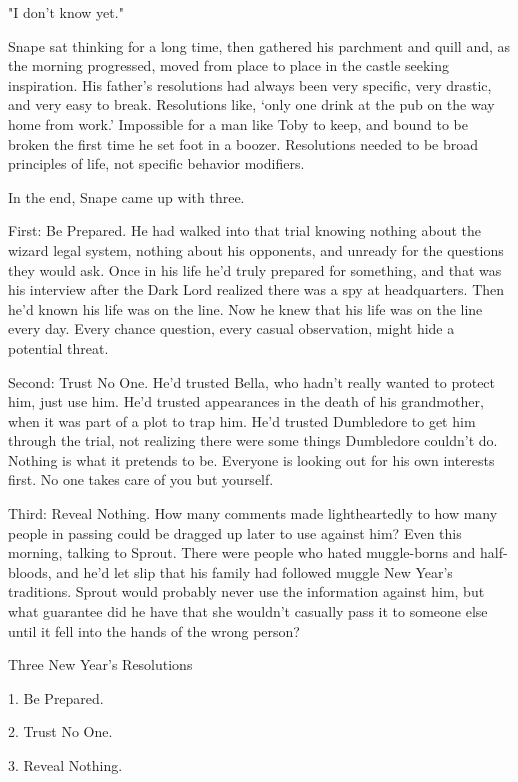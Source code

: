 "I don't know yet."

Snape sat thinking for a long time, then gathered his parchment and quill and, as the morning progressed, moved from place to place in the castle seeking inspiration. His father's resolutions had always been very specific, very drastic, and very easy to break. Resolutions like, `only one drink at the pub on the way home from work.' Impossible for a man like Toby to keep, and bound to be broken the first time he set foot in a boozer. Resolutions needed to be broad principles of life, not specific behavior modifiers.

In the end, Snape came up with three.

First: Be Prepared. He had walked into that trial knowing nothing about the wizard legal system, nothing about his opponents, and unready for the questions they would ask. Once in his life he'd truly prepared for something, and that was his interview after the Dark Lord realized there was a spy at headquarters. Then he'd known his life was on the line. Now he knew that his life was on the line every day. Every chance question, every casual observation, might hide a potential threat.

Second: Trust No One. He'd trusted Bella, who hadn't really wanted to protect him, just use him. He'd trusted appearances in the death of his grandmother, when it was part of a plot to trap him. He'd trusted Dumbledore to get him through the trial, not realizing there were some things Dumbledore couldn't do. Nothing is what it pretends to be. Everyone is looking out for his own interests first. No one takes care of you but yourself.

Third: Reveal Nothing. How many comments made lightheartedly to how many people in passing could be dragged up later to use against him? Even this morning, talking to Sprout. There were people who hated muggle-borns and half-bloods, and he'd let slip that his family had followed muggle New Year's traditions. Sprout would probably never use the information against him, but what guarantee did he have that she wouldn't casually pass it to someone else until it fell into the hands of the wrong person?

\begin{writtenNote}

Three New Year's Resolutions

1. Be Prepared.

2. Trust No One.

3. Reveal Nothing.

\end{writtenNote}

